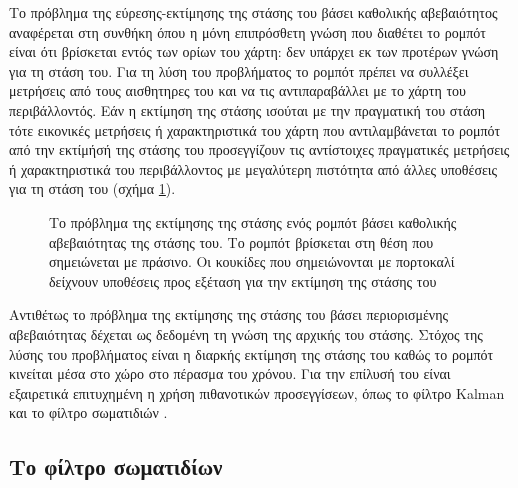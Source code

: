 Το πρόβλημα της εύρεσης-εκτίμησης της στάσης του βάσει καθολικής αβεβαιότητος
αναφέρεται στη συνθήκη όπου η μόνη επιπρόσθετη γνώση που διαθέτει το ρομπότ
είναι ότι βρίσκεται εντός των ορίων του χάρτη: δεν υπάρχει εκ των προτέρων
γνώση για τη στάση του. Για τη λύση του προβλήματος το ρομπότ πρέπει να
συλλέξει μετρήσεις από τους αισθητηρες του και να τις αντιπαραβάλλει με το
χάρτη του περιβάλλοντός. Εάν η εκτίμηση της στάσης ισούται με την πραγματική
του στάση τότε εικονικές μετρήσεις ή χαρακτηριστικά του χάρτη που
αντιλαμβάνεται το ρομπότ από την εκτίμήσή της στάσης του προσεγγίζουν τις
αντίστοιχες πραγματικές μετρήσεις ή χαρακτηριστικά του περιβάλλοντος με
μεγαλύτερη πιστότητα από άλλες υποθέσεις για τη στάση του (σχήμα
\ref{fig:global_localisation}).

\begin{figure}[htbp]\centering
  
  \caption{\small Το πρόβλημα της εκτίμησης της στάσης ενός ρομπότ βάσει καθολικής
           αβεβαιότητας της στάσης του. Το ρομπότ βρίσκεται στη θέση που
           σημειώνεται με πράσινο. Οι κουκίδες που σημειώνονται με πορτοκαλί
           δείχνουν υποθέσεις προς εξέταση για την εκτίμηση της στάσης του}
  \label{fig:global_localisation}
\end{figure}

Αντιθέτως το πρόβλημα της εκτίμησης της στάσης του βάσει περιορισμένης
αβεβαιότητας δέχεται ως δεδομένη τη γνώση της αρχικής του στάσης. Στόχος της
λύσης του προβλήματος είναι η διαρκής εκτίμηση της στάσης του καθώς το ρομπότ
κινείται μέσα στο χώρο στο πέρασμα του χρόνου. Για την επίλυσή του είναι
εξαιρετικά επιτυχημένη η χρήση πιθανοτικών προσεγγίσεων, όπως το φίλτρο Kalman
\cite{Maybeck1979} και το φίλτρο σωματιδιών \cite{Thrun2002a,Gustafsson2002}.

\subsection{Το φίλτρο σωματιδίων}
\label{subsec:01_01_02_3}

